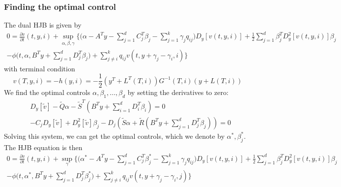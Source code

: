 \subsubsection{Finding the optimal control}
The dual HJB is given by
\begin{align*}
    0 = \frac{\partial v}{\partial t}(t, y, i) + \sup_{\alpha, \beta, \gamma} \bigg\{ 
    \bigg(\alpha - A^T y - \sum_{j=1}^d C_j^T \beta_j - \sum_{j=1}^k \gamma_j q_{ij}\bigg) D_y[v(t,y,i)] + \frac12 \sum_{j=1}^d \beta_j^T D_y^2[v(t,y,i)]\beta_j \\
    - \phi \big(t, \alpha, B^T y + \sum_{j=1}^d D_j^T \beta_j  \big) + \sum_{j \ne i}^k q_{ij} v(t, y+\gamma_j - \gamma_i, i)\bigg\}
\end{align*}
with terminal condition
\begin{equation*}
    v(T, y,i) = - h(y,i) = - \frac12 (y^T + L^T(T,i))G^{-1}(T,i)(y + L(T,i))
\end{equation*}
We find the optimal controls $\alpha, \beta_1, \dots, \beta_d$ by setting the derivatives to zero:
\begin{align}
    &D_y[\tilde{v}] - \tilde{Q}\alpha - \tilde{S}^T (B^T y + \sum_{i=1}^d D_i^T \beta_i) = 0 \label{eq: markov_primal_controls_system1}\\
    & - C_j D_y[\tilde{v}] + D_y^2[\tilde{v}] \beta_j
    - D_j (\tilde{S}\alpha + \tilde{R}(B^T y + \sum_{j=1}^d D_j^T \beta_j)) = 0 \label{eq: markov_primal_controls_system2}
\end{align}
Solving this system, we can get the optimal controls, which we denote by $\alpha^\ast, \beta_j^\ast$. The HJB equation is then
\begin{align*}
    0 = \frac{\partial v}{\partial t}(t, y, i) + \sup_{\gamma} \bigg\{ 
    \bigg(\alpha^\ast - A^T y - \sum_{j=1}^d C_j^T \beta_j^\ast - \sum_{j=1}^k \gamma_j q_{ij}\bigg) D_y[v(t,y,i)] + \frac12 \sum_{j=1}^d \beta_j^T D_y^2[v(t,y,i)]\beta_j \\
    - \phi \big(t, \alpha^\ast, B^T y + \sum_{j=1}^d D_j^T \beta_j^\ast  \big) + \sum_{j \ne i}^k q_{ij} v(t, y+\gamma_j - \gamma_i, j)\bigg\}
\end{align*}
